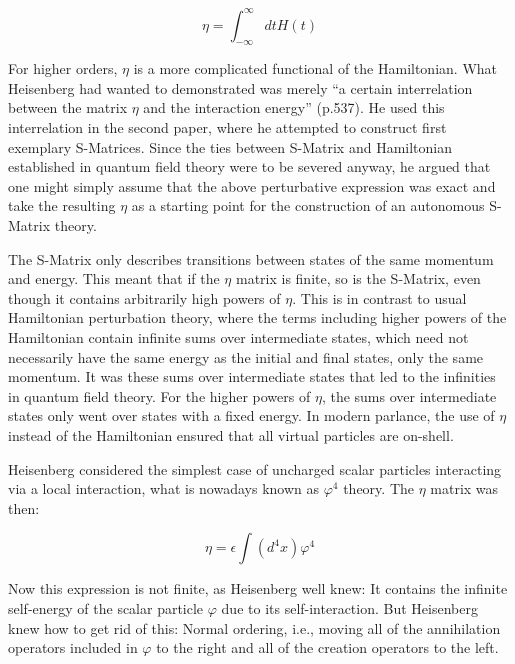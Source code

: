 \documentclass[12pt,a4paper]{article}
\begin{document}
\begin{equation}
\eta = \int_{- \infty}^{\infty} dt H(t)
\end{equation}

For higher orders, $\eta$ is a more complicated functional of the Hamiltonian. What Heisenberg had wanted to demonstrated  was merely ``a certain interrelation between the matrix $\eta$ and the interaction energy'' (p.537). He used this interrelation in the second paper, where he attempted to construct first exemplary S-Matrices. Since the ties between S-Matrix and Hamiltonian established in quantum field theory were to be severed anyway, he argued that one might simply assume that the above perturbative expression was exact and take the resulting $\eta$ as a starting point for the construction of an autonomous S-Matrix theory.

The S-Matrix only describes transitions between states of the same momentum and energy. This meant that if the $\eta$ matrix is finite, so is the S-Matrix, even though it contains arbitrarily high powers of $\eta$. This is in contrast to usual Hamiltonian perturbation theory, where the terms including higher powers of the Hamiltonian contain infinite sums over intermediate states, which need not necessarily have the same energy as the initial and final states, only the same momentum. It was these sums over intermediate states that led to the infinities in quantum field theory. For the higher powers of $\eta$, the sums over intermediate states only went over states with a fixed energy. In modern parlance, the use of $\eta$ instead of the Hamiltonian ensured that all virtual particles are on-shell.

Heisenberg considered the simplest case of uncharged scalar particles interacting via a local interaction, what is nowadays known as $\varphi^4$ theory. The $\eta$ matrix was then:

\begin{equation}
\eta = \epsilon \int (d^4x) \varphi^4
\end{equation}

Now this expression is not finite, as Heisenberg well knew: It contains the infinite self-energy of the scalar particle $\varphi$ due to its self-interaction. But Heisenberg knew how to get rid of this: Normal ordering, i.e., moving all of the annihilation operators included in $\varphi$ to the right and all of the creation operators to the left. 
\end{document}
